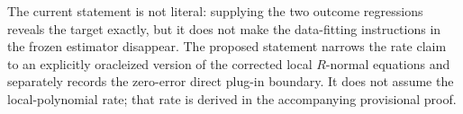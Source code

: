 The current statement is not literal: supplying the two outcome regressions reveals the target exactly, but it does not make the data-fitting instructions in the frozen estimator disappear.  The proposed statement narrows the rate claim to an explicitly oracleized version of the corrected local \(R\)-normal equations and separately records the zero-error direct plug-in boundary.  It does not assume the local-polynomial rate; that rate is derived in the accompanying provisional proof.